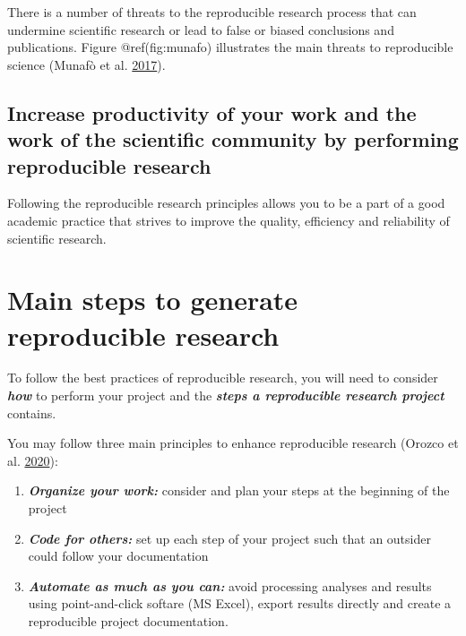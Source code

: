 \documentclass[
]{book}
\providecommand{\tightlist}{%
  \setlength{\itemsep}{0pt}\setlength{\parskip}{0pt}}
\begin{document}
There is a number of threats to the reproducible research process that
can undermine scientific research or lead to false or biased conclusions
and publications. Figure @ref(fig:munafo) illustrates the main threats
to reproducible science (Munafò et al.
\protect\hyperlink{ref-munafo_manifesto_2017}{2017}).

\hypertarget{increase-productivity-of-your-work-and-the-work-of-the-scientific-community-by-performing-reproducible-research}{%
\subsection{Increase productivity of your work and the work of the
scientific community by performing reproducible
research}\label{increase-productivity-of-your-work-and-the-work-of-the-scientific-community-by-performing-reproducible-research}}

Following the reproducible research principles allows you to be a part
of a good academic practice that strives to improve the quality,
efficiency and reliability of scientific research.

\hypertarget{main-steps-to-generate-reproducible-research}{%
\section{Main steps to generate reproducible
research}\label{main-steps-to-generate-reproducible-research}}

To follow the best practices of reproducible research, you will need to
consider \textbf{\emph{how}} to perform your project and the
\textbf{\emph{steps a reproducible research project}} contains.

You may follow three main principles to enhance reproducible research
(Orozco et al. \protect\hyperlink{ref-orozco_how_2020}{2020}):

\begin{enumerate}
\def\labelenumi{\arabic{enumi}.}
\tightlist
\item
  \textbf{\emph{Organize your work:}} consider and plan your steps at
  the beginning of the project
\item
  \textbf{\emph{Code for others:}} set up each step of your project such
  that an outsider could follow your documentation
\item
  \textbf{\emph{Automate as much as you can:}} avoid processing analyses
  and results using point-and-click softare (MS Excel), export results
  directly and create a reproducible project documentation.
\end{enumerate}
\end{document}
